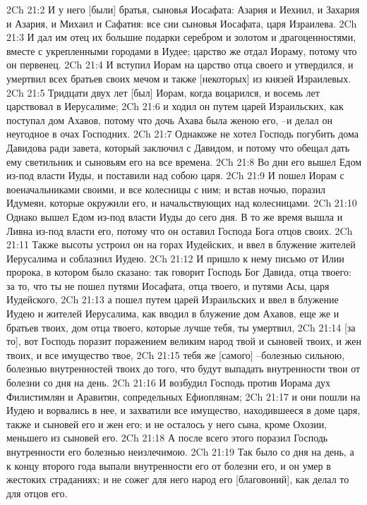 2Ch 21:2  И у него [были] братья, сыновья Иосафата: Азария и Иехиил, и Захария и Азария, и Михаил и Сафатия: все сии сыновья Иосафата, царя Израилева.
2Ch 21:3  И дал им отец их большие подарки серебром и золотом и драгоценностями, вместе с укрепленными городами в Иудее; царство же отдал Иораму, потому что он первенец.
2Ch 21:4  И вступил Иорам на царство отца своего и утвердился, и умертвил всех братьев своих мечом и также [некоторых] из князей Израилевых.
2Ch 21:5  Тридцати двух лет [был] Иорам, когда воцарился, и восемь лет царствовал в Иерусалиме;
2Ch 21:6  и ходил он путем царей Израильских, как поступал дом Ахавов, потому что дочь Ахава была женою его, --и делал он неугодное в очах Господних.
2Ch 21:7  Однакоже не хотел Господь погубить дома Давидова ради завета, который заключил с Давидом, и потому что обещал дать ему светильник и сыновьям его на все времена.
2Ch 21:8  Во дни его вышел Едом из-под власти Иуды, и поставили над собою царя.
2Ch 21:9  И пошел Иорам с военачальниками своими, и все колесницы с ним; и встав ночью, поразил Идумеян, которые окружили его, и начальствующих над колесницами.
2Ch 21:10  Однако вышел Едом из-под власти Иуды до сего дня. В то же время вышла и Ливна из-под власти его, потому что он оставил Господа Бога отцов своих.
2Ch 21:11  Также высоты устроил он на горах Иудейских, и ввел в блужение жителей Иерусалима и соблазнил Иудею.
2Ch 21:12  И пришло к нему письмо от Илии пророка, в котором было сказано: так говорит Господь Бог Давида, отца твоего: за то, что ты не пошел путями Иосафата, отца твоего, и путями Асы, царя Иудейского,
2Ch 21:13  а пошел путем царей Израильских и ввел в блужение Иудею и жителей Иерусалима, как вводил в блужение дом Ахавов, еще же и братьев твоих, дом отца твоего, которые лучше тебя, ты умертвил,
2Ch 21:14  [за то], вот Господь поразит поражением великим народ твой и сыновей твоих, и жен твоих, и все имущество твое,
2Ch 21:15  тебя же [самого] --болезнью сильною, болезнью внутренностей твоих до того, что будут выпадать внутренности твои от болезни со дня на день.
2Ch 21:16  И возбудил Господь против Иорама дух Филистимлян и Аравитян, сопредельных Ефиоплянам;
2Ch 21:17  и они пошли на Иудею и ворвались в нее, и захватили все имущество, находившееся в доме царя, также и сыновей его и жен его; и не осталось у него сына, кроме Охозии, меньшего из сыновей его.
2Ch 21:18  А после всего этого поразил Господь внутренности его болезнью неизлечимою.
2Ch 21:19  Так было со дня на день, а к концу второго года выпали внутренности его от болезни его, и он умер в жестоких страданиях; и не сожег для него народ его [благовоний], как делал то для отцов его.
